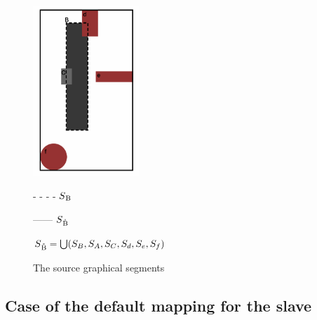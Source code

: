 \documentclass[a4paper]{article}
\begin{document}
\begin{figure}[h]

\begin{multicols}{2}

\includegraphics[width=4cm]{img/score3.png}   	            

\columnbreak

 - - - -  $S\textsubscript{B}$ %

\bigskip

 ------  $S\textsubscript{\r{B}}$ %

\bigskip

 $S\textsubscript{\r{B}} = \bigcup(S_B, S_A, S_C, S_d, S_e, S_f) $

\end{multicols}
\caption{The source graphical segments}
\label{fig:sync}
\end{figure}


%
%  
%
%
%
%
%

\subsection{Case of the default mapping for the slave}\label{subsec:defaultMap}
\end{document}

